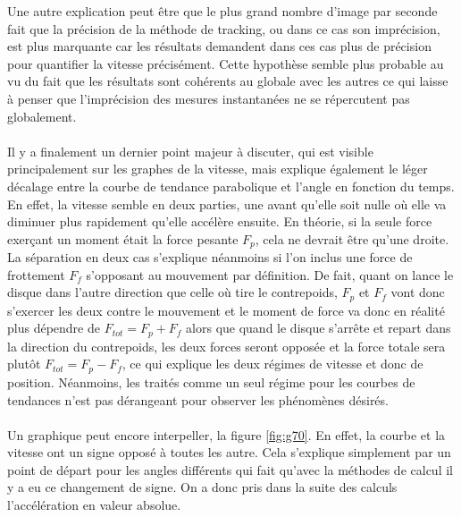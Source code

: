 Une autre explication peut être que le plus grand nombre d'image par seconde fait que la précision de la méthode de tracking, ou dans ce cas son imprécision, est plus marquante car les résultats demandent dans ces cas plus de précision pour quantifier la vitesse précisément. Cette hypothèse semble plus probable au vu du fait que les résultats sont cohérents au globale avec les autres ce qui laisse à penser que l'imprécision des mesures instantanées ne se répercutent pas globalement.\\ \\
Il y a finalement un dernier point majeur à discuter, qui est visible principalement sur les graphes de la vitesse, mais explique également le léger décalage entre la courbe de tendance parabolique et l'angle en fonction du temps. En effet, la vitesse semble en deux parties, une avant qu'elle soit nulle où elle va diminuer plus rapidement qu'elle accélère ensuite. En théorie, si la seule force exerçant un moment était la force pesante $F_p$, cela ne devrait être qu'une droite. La séparation en deux cas s'explique néanmoins si l'on inclus une force de frottement $F_f$ s'opposant au mouvement par définition. De fait, quant on lance le disque dans l'autre direction que celle où tire le contrepoids, $F_p$ et $F_f$ vont donc s'exercer les deux contre le mouvement et le moment de force va donc en réalité plus dépendre de $F_{tot} = F_p + F_f$ alors que quand le disque s'arrête et repart dans la direction du contrepoids, les deux forces seront opposée et la force totale sera plutôt $F_{tot} = F_p - F_f$, ce qui explique les deux régimes de vitesse et donc de position. Néanmoins, les traités comme un seul régime pour les courbes de tendances n'est pas dérangeant pour observer les phénomènes désirés.\\ \\
Un graphique peut encore interpeller, la figure \ref{fig:g70}. En effet, la courbe et la vitesse ont un signe opposé à toutes les autre. Cela s'explique simplement par un point de départ pour les angles différents qui fait qu'avec la méthodes de calcul il y a eu ce changement de signe. On a donc pris dans la suite des calculs  l'accélération en valeur absolue.
